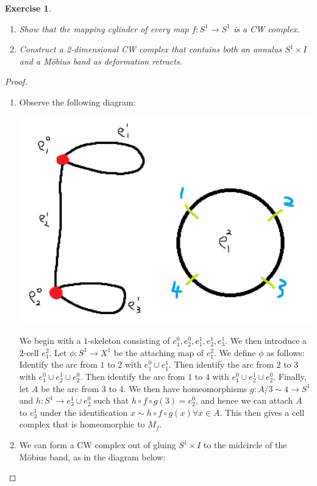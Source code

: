 \documentclass{article}
\newtheorem{exercise}[theorem]{Exercise}
\begin{document}
\begin{exercise}
\begin{enumerate}
\item[(a)] Show that the mapping cylinder of every map $f:S^1\to S^1$ is a CW complex.
\item[(b)] Construct a 2-dimensional CW complex that contains both an annulus $S^1\times I$ and a M\"obius band as deformation retracts.
\end{enumerate}
\end{exercise}
\begin{proof}
\begin{enumerate}
\item[(a)]
Observe the following diagram:


\includegraphics[scale=0.5]{Screenshot (1346).png}

We begin with a $1$-skeleton consisting of $e_1^0,e_2^0,e_1^1,e_2^1,e_3^1$. We then introduce a $2$-cell $e_1^2$. Let $\phi:S^1\to X^1$ be the attaching map of $e_1^2$. We define $\phi$ as follows: Identify the arc from $1$ to $2$ with $e_1^0\cup e_1^1$. Then identify the arc from $2$ to $3$ with $e_1^0\cup e_2^1\cup e_2^0$. Then identify the arc from $1$ to $4$ with $e_1^0\cup e_2^1\cup e_2^0$. Finally, let $A$ be the arc from $3$ to $4$. We then have homeomorphisms $g:A/3\sim 4\to S^1$ and $h:S^1\to e_3^1\cup e_2^0$ such that $h\circ f\circ g(3)=e_2^0$, and hence we can attach $A$ to $e_3^1$ under the identification $x\sim h\circ f\circ g(x)\forall x\in A$. This then gives a cell complex that is homeomorphic to $M_f$.
\item[(b)] We can form a CW complex out of gluing $S^1\times I$ to the midcircle of the M\"obius band, as in the diagram below:



\end{enumerate}
\end{proof}
\end{document}
